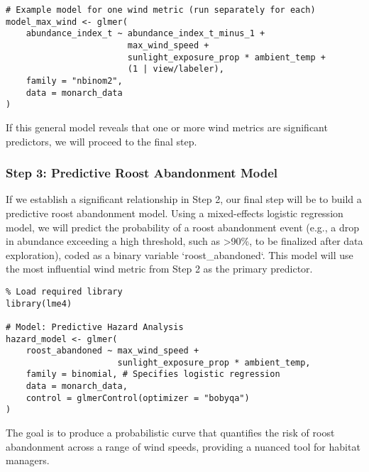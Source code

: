 \begin{verbatim}
# Example model for one wind metric (run separately for each)
model_max_wind <- glmer(
    abundance_index_t ~ abundance_index_t_minus_1 + 
                        max_wind_speed + 
                        sunlight_exposure_prop * ambient_temp +
                        (1 | view/labeler),
    family = "nbinom2",
    data = monarch_data
)
\end{verbatim}

If this general model reveals that one or more wind metrics are significant predictors, we will proceed to the final step.

\subsubsection{Step 3: Predictive Roost Abandonment Model}

If we establish a significant relationship in Step 2, our final step will be to build a predictive roost abandonment model. Using a mixed-effects logistic regression model, we will predict the probability of a roost abandonment event (e.g., a drop in abundance exceeding a high threshold, such as >90\%, to be finalized after data exploration), coded as a binary variable `roost_abandoned`. This model will use the most influential wind metric from Step 2 as the primary predictor.

\begin{verbatim}
% Load required library
library(lme4)

# Model: Predictive Hazard Analysis
hazard_model <- glmer(
    roost_abandoned ~ max_wind_speed + 
                      sunlight_exposure_prop * ambient_temp,
    family = binomial, # Specifies logistic regression
    data = monarch_data,
    control = glmerControl(optimizer = "bobyqa")
)
\end{verbatim}

The goal is to produce a probabilistic curve that quantifies the risk of roost abandonment across a range of wind speeds, providing a nuanced tool for habitat managers.